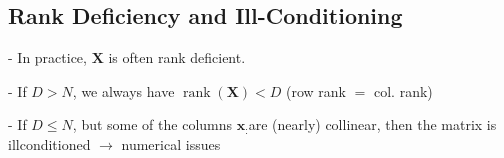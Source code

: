 

\subsection*{Rank Deficiency and Ill-Conditioning}
- In practice, $\mathbf{X}$ is often rank deficient.

- If $D>N$, we always have $\operatorname{rank}(\mathbf{X})<D$ (row rank $=$ col. rank)

- If $D \leq N$, but some of the columns $\mathbf{x}_{:}$are (nearly) collinear, then the matrix is illconditioned $\rightarrow$ numerical issues



